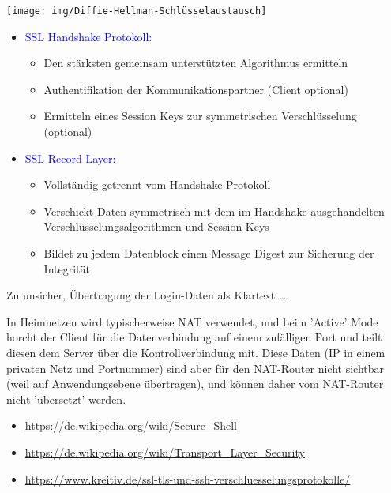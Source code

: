 \medskip
\texttt{[image: img/Diffie-Hellman-Schlüsselaustausch]}

\begin{itemize}
    \item \textcolor{blue}{SSL Handshake Protokoll:}
    \begin{itemize}
        \item Den stärksten gemeinsam unterstützten Algorithmus ermitteln
        \item Authentifikation der Kommunikationspartner (Client optional)
        \item Ermitteln eines Session Keys zur symmetrischen Verschlüsselung (optional)
    \end{itemize}
    \item \textcolor{blue}{SSL Record Layer:}
    \begin{itemize}
        \item Vollständig getrennt vom Handshake Protokoll
        \item Verschickt Daten symmetrisch mit dem im Handshake ausgehandelten Verschlüsselungsalgorithmen und Session Keys
        \item Bildet zu jedem Datenblock einen Message Digest zur Sicherung der Integrität
    \end{itemize}
\end{itemize}

Zu unsicher, Übertragung der Login-Daten als Klartext \ldots

In Heimnetzen wird typischerweise NAT verwendet, und beim 'Active' Mode horcht der Client für die Datenverbindung auf einem zufälligen Port und teilt diesen dem Server über die Kontrollverbindung mit.
Diese Daten (IP in einem privaten Netz und Portnummer) sind aber für den NAT-Router nicht sichtbar (weil auf Anwendungsebene übertragen), und können daher vom NAT-Router nicht 'übersetzt' werden.

\begin{itemize}
    \item \url{https://de.wikipedia.org/wiki/Secure_Shell}
    \item \url{https://de.wikipedia.org/wiki/Transport_Layer_Security}
    \item \url{https://www.kreitiv.de/ssl-tls-und-ssh-verschluesselungsprotokolle/}
\end{itemize}

